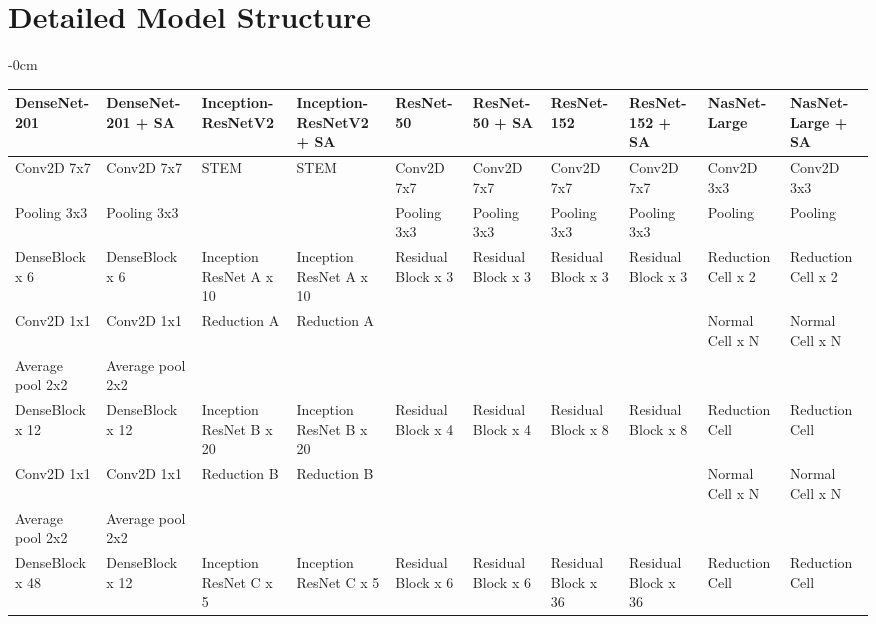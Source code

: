 \documentclass[sensors,article,submit,pdftex,moreauthors]{Definitions/mdpi}
\begin{document}
	
	\appendixstart
	\appendix
	\section[\appendixname~\thesection]{Detailed Model Structure}
	
	\begin{table}[H]
		\begin{adjustwidth}{-\extralength}{0cm}
			\begin{tabularx}{\fulllength}{p{1.4cm} | p{1.4cm} | p{1.4cm} | p{1.4cm} | p{1.4cm} | p{1.4cm} | p{1.4cm} | p{1.4cm} | p{1.4cm} | p{1.4cm}}
				\toprule
				\textbf{DenseNet-201} & \textbf{DenseNet-201 + SA} & \textbf{Inception-ResNetV2} & \textbf{Inception-ResNetV2 + SA} & \textbf{ResNet-50} & \textbf{ResNet-50 + SA} & \textbf{ResNet-152} & \textbf{ResNet-152 + SA} & \textbf{NasNet-Large} & \textbf{NasNet-Large + SA}\\
				\midrule
				Conv2D 7x7 & Conv2D 7x7 & STEM& STEM& Conv2D 7x7& Conv2D 7x7& Conv2D 7x7& Conv2D 7x7& Conv2D 3x3& Conv2D 3x3\\ \hline
				Pooling 3x3 & Pooling 3x3 & & & Pooling 3x3& Pooling  3x3& Pooling  3x3& Pooling  3x3& Pooling& Pooling\\ \hline		
				DenseBlock x 6 & DenseBlock x 6 & Inception ResNet A x 10& Inception ResNet A x 10& Residual Block x 3& Residual Block x 3& Residual Block x 3& Residual Block x 3& Reduction Cell x 2& Reduction Cell x 2\\  \hline
				Conv2D 1x1 & Conv2D 1x1 & Reduction A & Reduction A & & & & & Normal Cell x N& Normal Cell x N\\	\hline			
				Average pool 2x2 & Average pool 2x2 & & & & & & & & \\ \hline			
				DenseBlock x 12 & DenseBlock x 12 & Inception ResNet B x 20& Inception ResNet B x 20& Residual Block x 4& Residual Block x 4& Residual Block x 8& Residual Block x 8& Reduction Cell& Reduction Cell\\ \hline
				Conv2D 1x1 & Conv2D 1x1 & Reduction B & Reduction B & & & & & Normal Cell x N& Normal Cell x N\\			\hline
				Average pool 2x2 & Average pool 2x2 & & & & & & & & \\ \hline
				DenseBlock x 48 & DenseBlock x 12 & Inception ResNet C x 5& Inception ResNet C x 5& Residual Block x 6& Residual Block x 6& Residual Block x 36& Residual Block x 36& Reduction Cell& Reduction Cell\\ \hline

\end{tabularx}
\end{adjustwidth}
\end{table}
\end{document}
